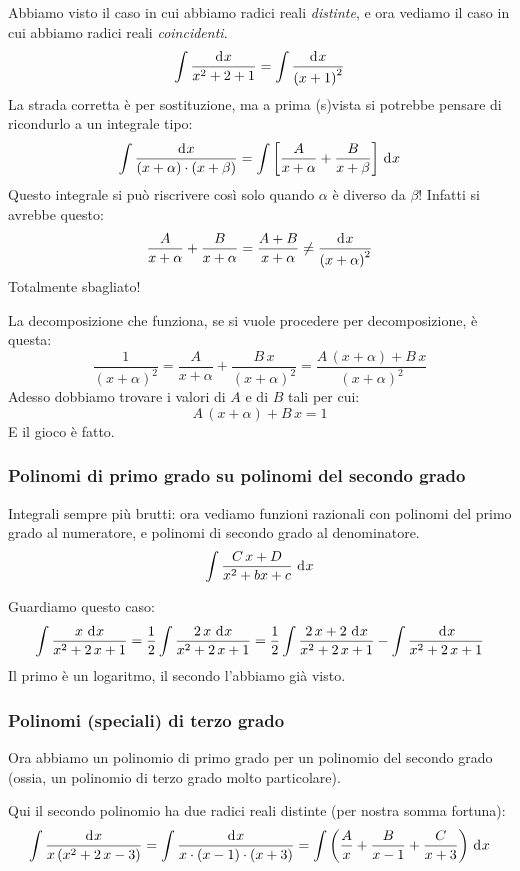 Abbiamo visto il caso in cui abbiamo radici reali \emph{distinte}, e ora vediamo il caso in cui abbiamo radici reali \emph{coincidenti}.
\[
\int \frac{\diff x}{x^2 + 2 + 1} =
\int \frac{\diff x}{{(x + 1)}^2}
\]
La strada corretta \`e per sostituzione, ma a prima (s)vista si potrebbe pensare di ricondurlo a un integrale tipo:
\[
\int \frac{\diff x}{(x + \alpha) \cdot (x + \beta)} =
\int \left[ \frac{A}{x + \alpha} + \frac{B}{x + \beta} \right] \dx
\]
Questo integrale si pu\`o riscrivere cos\`i solo quando $\alpha$ \`e diverso da $\beta$! Infatti si avrebbe questo:
\[
\frac{A}{x + \alpha} + \frac{B}{x + \alpha} = \frac{A + B}{x + \alpha} \neq \frac{\diff x}{{(x + \alpha)}^2}
\]
Totalmente sbagliato!

La decomposizione che funziona, se si vuole procedere per decomposizione, \`e questa:
\[
\frac{1}{{(x + \alpha)}^2} =
\frac{A}{x + \alpha} + \frac{B \, x}{{(x + \alpha)}^2} =
\frac{A \, (x + \alpha) + B \, x}{{(x + \alpha)}^2}
\]
Adesso dobbiamo trovare i valori di $A$ e di $B$ tali per cui:
\[
A \, (x + \alpha) + B \, x = 1
\]
E il gioco \`e fatto.

\subsubsection{Polinomi di primo grado su polinomi del secondo grado}

Integrali sempre pi\`u brutti: ora vediamo funzioni razionali con polinomi del primo grado al numeratore, e polinomi di secondo grado al denominatore.
\[
\int \frac{C \, x + D}{x^2 + bx + c} \dx
\]

\begin{exmp}
Guardiamo questo caso:
\[
\int \frac{x \dx}{x^2 + 2 \,x + 1} =
\frac{1}{2} \int \frac{2 \,x \dx}{x^2 + 2 \, x + 1} =
\frac{1}{2} \int \frac{2 \, x + 2 \dx}{x^2 + 2 \, x + 1} - \int \frac{\dx}{x^2 + 2 \, x + 1}
\]
Il primo \`e un logaritmo, il secondo l'abbiamo gi\`a visto.
\end{exmp}

\subsubsection{Polinomi (speciali) di terzo grado}

Ora abbiamo un polinomio di primo grado per un polinomio del secondo grado (ossia, un polinomio di terzo grado molto particolare).

\begin{exmp}
Qui il secondo polinomio ha due radici reali distinte (per nostra somma fortuna):
\[
\int \frac{\diff x}{x \, (x^2 + 2 \, x - 3)} =
\int \frac{\diff x}{x \cdot (x - 1) \cdot (x + 3)} =
\int \left( \frac{A}{x} + \frac{B}{x - 1} + \frac{C}{x + 3} \right) \dx
\]
\end{exmp}

